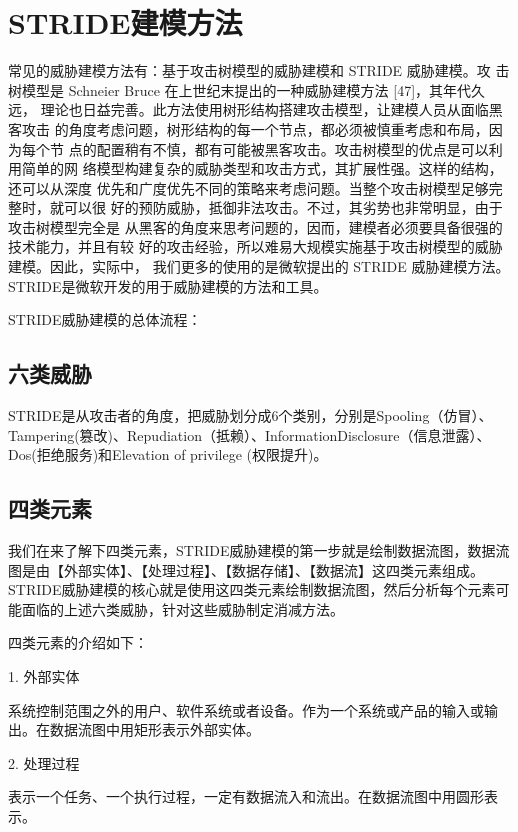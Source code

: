 \section{STRIDE建模方法}

常见的威胁建模方法有：基于攻击树模型的威胁建模和 STRIDE 威胁建模。攻
击树模型是 Schneier Bruce 在上世纪末提出的一种威胁建模方法 [47]，其年代久远，
理论也日益完善。此方法使用树形结构搭建攻击模型，让建模人员从面临黑客攻击
的角度考虑问题，树形结构的每一个节点，都必须被慎重考虑和布局，因为每个节
点的配置稍有不慎，都有可能被黑客攻击。攻击树模型的优点是可以利用简单的网
络模型构建复杂的威胁类型和攻击方式，其扩展性强。这样的结构，还可以从深度
优先和广度优先不同的策略来考虑问题。当整个攻击树模型足够完整时，就可以很
好的预防威胁，抵御非法攻击。不过，其劣势也非常明显，由于攻击树模型完全是
从黑客的角度来思考问题的，因而，建模者必须要具备很强的技术能力，并且有较
好的攻击经验，所以难易大规模实施基于攻击树模型的威胁建模。因此，实际中，
我们更多的使用的是微软提出的 STRIDE 威胁建模方法。
\newline
STRIDE是微软开发的用于威胁建模的方法和工具。

STRIDE威胁建模的总体流程：

\subsection[]{六类威胁}

STRIDE是从攻击者的角度，把威胁划分成6个类别，分别是Spooling（仿冒）、Tampering(篡改)、Repudiation（抵赖）、InformationDisclosure（信息泄露）、Dos(拒绝服务)和Elevation of privilege (权限提升)。

\subsection[]{四类元素}

我们在来了解下四类元素，STRIDE威胁建模的第一步就是绘制数据流图，数据流图是由【外部实体】、【处理过程】、【数据存储】、【数据流】这四类元素组成。STRIDE威胁建模的核心就是使用这四类元素绘制数据流图，然后分析每个元素可能面临的上述六类威胁，针对这些威胁制定消减方法。

四类元素的介绍如下：

1.  外部实体

系统控制范围之外的用户、软件系统或者设备。作为一个系统或产品的输入或输出。在数据流图中用矩形表示外部实体。

2.  处理过程

表示一个任务、一个执行过程，一定有数据流入和流出。在数据流图中用圆形表示。

